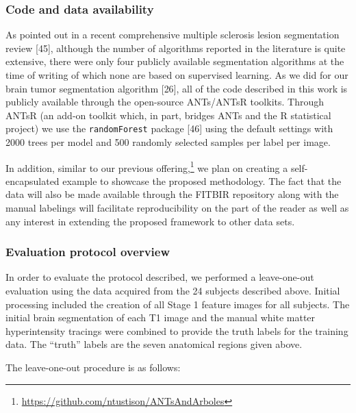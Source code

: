 \documentclass[11pt,]{article}
\let\rmarkdownfootnote\footnote%
\def\footnote{\protect\rmarkdownfootnote}
\begin{document}
\subsubsection{Code and data
availability}\label{code-and-data-availability}

As pointed out in a recent comprehensive multiple sclerosis lesion
segmentation review {[}45{]}, although the number of algorithms reported
in the literature is quite extensive, there were only four publicly
available segmentation algorithms at the time of writing of which none
are based on supervised learning. As we did for our brain tumor
segmentation algorithm {[}26{]}, all of the code described in this work
is publicly available through the open-source ANTs/ANTsR toolkits.
Through ANTsR (an add-on toolkit which, in part, bridges ANTs and the R
statistical project) we use the \texttt{randomForest} package {[}46{]}
using the default settings with 2000 trees per model and 500 randomly
selected samples per label per image.

In addition, similar to our previous offering,\footnote{\url{https://github.com/ntustison/ANTsAndArboles}}
we plan on creating a self-encapsulated example to showcase the proposed
methodology. The fact that the data will also be made available through
the FITBIR repository along with the manual labelings will facilitate
reproducibility on the part of the reader as well as any interest in
extending the proposed framework to other data sets.

\subsubsection{Evaluation protocol
overview}\label{evaluation-protocol-overview}

In order to evaluate the protocol described, we performed a
leave-one-out evaluation using the data acquired from the 24 subjects
described above. Initial processing included the creation of all Stage 1
feature images for all subjects. The initial brain segmentation of each
T1 image and the manual white matter hyperintensity tracings were
combined to provide the truth labels for the training data. The
``truth'' labels are the seven anatomical regions given above.

The leave-one-out procedure is as follows:
\end{document}
